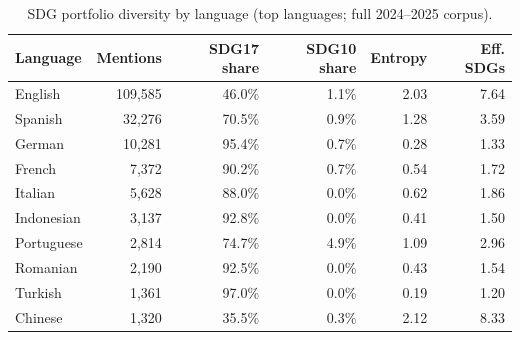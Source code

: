 \begin{table}[H]
\centering
\caption{SDG portfolio diversity by language (top languages; full 2024--2025 corpus).}
\label{tab:lang_diversity}
\begin{tabular}{lrrrrr}
\toprule
Language & Mentions & SDG17 share & SDG10 share & Entropy & Eff. SDGs \\
\midrule
English & 109,585 & 46.0\% & 1.1\% & 2.03 & 7.64 \\
Spanish & 32,276 & 70.5\% & 0.9\% & 1.28 & 3.59 \\
German & 10,281 & 95.4\% & 0.7\% & 0.28 & 1.33 \\
French & 7,372 & 90.2\% & 0.7\% & 0.54 & 1.72 \\
Italian & 5,628 & 88.0\% & 0.0\% & 0.62 & 1.86 \\
Indonesian & 3,137 & 92.8\% & 0.0\% & 0.41 & 1.50 \\
Portuguese & 2,814 & 74.7\% & 4.9\% & 1.09 & 2.96 \\
Romanian & 2,190 & 92.5\% & 0.0\% & 0.43 & 1.54 \\
Turkish & 1,361 & 97.0\% & 0.0\% & 0.19 & 1.20 \\
Chinese & 1,320 & 35.5\% & 0.3\% & 2.12 & 8.33 \\
\bottomrule
\end{tabular}
\end{table}
